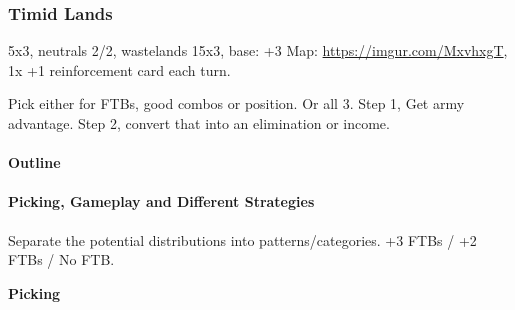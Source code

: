 \subsubsection{Timid Lands}

5x3, neutrals 2/2, wastelands 15x3, base: +3
Map: \url{https://imgur.com/MxvhxgT}, 1x +1 reinforcement card each turn.

Pick either for FTBs, good combos or position. Or all 3. Step 1, Get army advantage. Step 2, convert that into an elimination or income. 

\paragraph{Outline}

\paragraph{Picking, Gameplay and Different Strategies}

Separate the potential distributions into patterns/categories. +3 FTBs / +2 FTBs / No FTB. 

\textbf{Picking}

